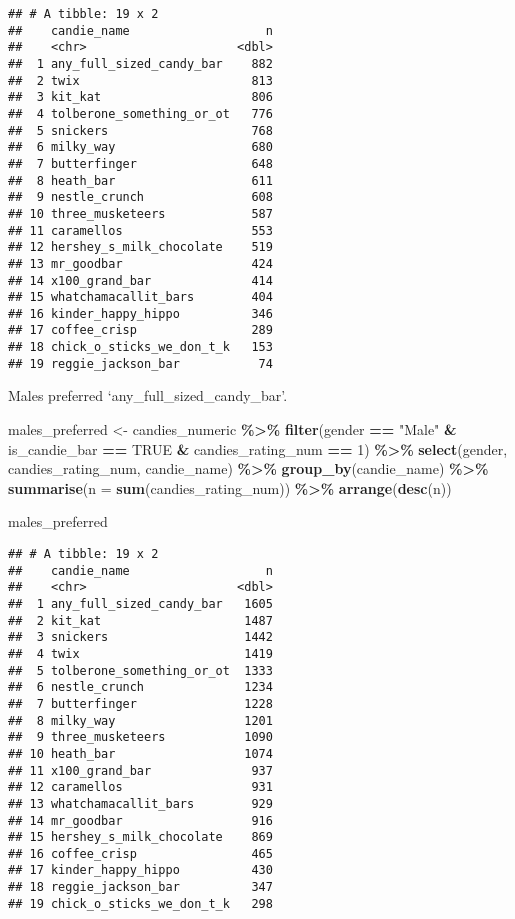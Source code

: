 \documentclass[
]{article}
\newenvironment{Shaded}{\begin{snugshade}}{\end{snugshade}}
\newcommand{\AttributeTok}[1]{\textcolor[rgb]{0.13,0.29,0.53}{#1}}
\newcommand{\ConstantTok}[1]{\textcolor[rgb]{0.56,0.35,0.01}{#1}}
\newcommand{\DecValTok}[1]{\textcolor[rgb]{0.00,0.00,0.81}{#1}}
\newcommand{\FunctionTok}[1]{\textcolor[rgb]{0.13,0.29,0.53}{\textbf{#1}}}
\newcommand{\NormalTok}[1]{#1}
\newcommand{\OtherTok}[1]{\textcolor[rgb]{0.56,0.35,0.01}{#1}}
\newcommand{\SpecialCharTok}[1]{\textcolor[rgb]{0.81,0.36,0.00}{\textbf{#1}}}
\newcommand{\StringTok}[1]{\textcolor[rgb]{0.31,0.60,0.02}{#1}}
\begin{document}
\begin{verbatim}
## # A tibble: 19 x 2
##    candie_name                   n
##    <chr>                     <dbl>
##  1 any_full_sized_candy_bar    882
##  2 twix                        813
##  3 kit_kat                     806
##  4 tolberone_something_or_ot   776
##  5 snickers                    768
##  6 milky_way                   680
##  7 butterfinger                648
##  8 heath_bar                   611
##  9 nestle_crunch               608
## 10 three_musketeers            587
## 11 caramellos                  553
## 12 hershey_s_milk_chocolate    519
## 13 mr_goodbar                  424
## 14 x100_grand_bar              414
## 15 whatchamacallit_bars        404
## 16 kinder_happy_hippo          346
## 17 coffee_crisp                289
## 18 chick_o_sticks_we_don_t_k   153
## 19 reggie_jackson_bar           74
\end{verbatim}

Males preferred `any\_full\_sized\_candy\_bar'.

\begin{Shaded}
\begin{Highlighting}[]
\NormalTok{males\_preferred }\OtherTok{\textless{}{-}}\NormalTok{ candies\_numeric }\SpecialCharTok{\%\textgreater{}\%} 
  \FunctionTok{filter}\NormalTok{(gender }\SpecialCharTok{==} \StringTok{"Male"} \SpecialCharTok{\&}\NormalTok{ is\_candie\_bar }\SpecialCharTok{==} \ConstantTok{TRUE} \SpecialCharTok{\&}\NormalTok{ candies\_rating\_num }\SpecialCharTok{==} \DecValTok{1}\NormalTok{) }\SpecialCharTok{\%\textgreater{}\%}
  \FunctionTok{select}\NormalTok{(gender, candies\_rating\_num, candie\_name) }\SpecialCharTok{\%\textgreater{}\%}
  \FunctionTok{group\_by}\NormalTok{(candie\_name) }\SpecialCharTok{\%\textgreater{}\%} 
  \FunctionTok{summarise}\NormalTok{(}\AttributeTok{n =} \FunctionTok{sum}\NormalTok{(candies\_rating\_num)) }\SpecialCharTok{\%\textgreater{}\%} 
  \FunctionTok{arrange}\NormalTok{(}\FunctionTok{desc}\NormalTok{(n)) }


\NormalTok{males\_preferred}
\end{Highlighting}
\end{Shaded}

\begin{verbatim}
## # A tibble: 19 x 2
##    candie_name                   n
##    <chr>                     <dbl>
##  1 any_full_sized_candy_bar   1605
##  2 kit_kat                    1487
##  3 snickers                   1442
##  4 twix                       1419
##  5 tolberone_something_or_ot  1333
##  6 nestle_crunch              1234
##  7 butterfinger               1228
##  8 milky_way                  1201
##  9 three_musketeers           1090
## 10 heath_bar                  1074
## 11 x100_grand_bar              937
## 12 caramellos                  931
## 13 whatchamacallit_bars        929
## 14 mr_goodbar                  916
## 15 hershey_s_milk_chocolate    869
## 16 coffee_crisp                465
## 17 kinder_happy_hippo          430
## 18 reggie_jackson_bar          347
## 19 chick_o_sticks_we_don_t_k   298
\end{verbatim}
\end{document}
